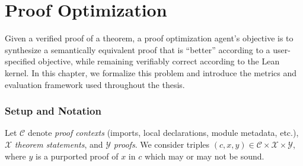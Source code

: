 \chapter{Proof Optimization}\label{chap:framework}

\setlength{\parindent}{1em}




Given a verified proof of a theorem, a proof optimization agent's objective is to synthesize a semantically equivalent proof that is ``better'' according to a user-specified objective, while remaining verifiably correct according to the Lean kernel. In this chapter, we formalize this problem and introduce the metrics and evaluation framework used throughout the thesis.

\subsection{Setup and Notation}
\label{sec:setup}

\begin{definition}
Let $\mathcal{C}$ denote \emph{proof contexts} (imports, local declarations, module metadata, etc.), $\mathcal{X}$ \emph{theorem statements}, and $\mathcal{Y}$ \emph{proofs}. We consider triples $(c,x,y)\in \mathcal{C}\times\mathcal{X}\times\mathcal{Y}$, where $y$ is a purported proof of $x$ in $c$ which may or may not be sound.
\end{definition}



